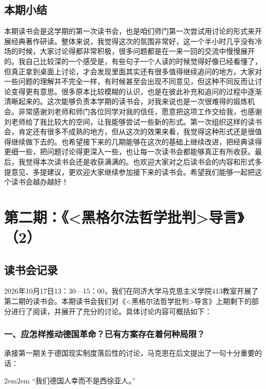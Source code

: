 \documentclass[a4paper,twoside,12pt,AutoFakeBold]{ctexart}
\begin{document}
\subsection{本期小结}
本期读书会是这学期的第一次读书会，也是咱们师门第一次尝试用讨论的形式来开展经典著作研读。整体来说，我觉得这次的氛围非常好，这一个半小时几乎没有冷场的时候，大家讨论得都非常积极，很多问题都是在一来一回的交流中慢慢展开的。我自己比较深的一个感受是，有些句子一个人读的时候觉得好像已经看懂了，但真正拿到桌面上讨论，才会发现里面其实还有很多值得继续追问的地方。大家对一些问题的理解并不完全一样，有时候甚至会出现不同意见，但这种不同反而让讨论变得更有意思。很多原本比较模糊的认识，也是在彼此补充和追问的过程中逐渐清晰起来的。这次能够负责本学期的读书会，对我来说也是一次很难得的锻炼机会。非常感谢刘老师和师门各位同学对我的信任，愿意把这项工作交给我，也感谢刘老师给了我比较大的空间，让我能够尝试一些新的形式。第一次组织这样的读书会，肯定还有很多不成熟的地方，但从这次的效果来看，我觉得这种形式还是很值得继续做下去的。也希望接下来的几期能够在这次的基础上继续改进，把经典读得更细一些，把问题讨论得更深入一些，也让每一次读书会都能够真正有所收获。最后，我觉得本次读书会还是收获满满的。也欢迎大家对之后读书会的内容和形式多提意见、多提建议，更欢迎大家继续参加接下来的读书会。希望我们能够一起把这个读书会越办越好！

\newpage

\section{第二期：《<黑格尔法哲学批判>导言》（2）}
\subsection{读书会记录}
2026年10月17日13：30—15：00，我们在同济大学马克思主义学院413教室开展了第二期的读书会。本期读书会我们对《<黑格尔法哲学批判>导言》上期剩下的部分进行了阅读，并展开了充分的讨论。具体讨论内容可概括如下：

\subsubsection{一、应怎样推动德国革命？已有方案存在着何种局限？}\label{sec:2.1}

承接第一期关于德国现实制度落后性的讨论，马克思在后文提出了一句十分重要的话：

\begin{adjustwidth}{2em}{2em}
\qquad\fangsong
“我们德国人幸而不是西徐亚人。”
\end{adjustwidth}
\end{document}
